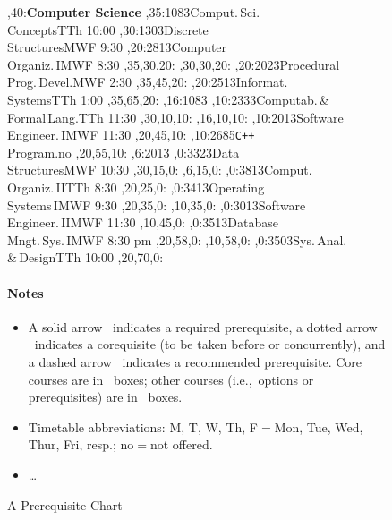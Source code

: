 \documentclass[11pt]{article}
\begin{document}
\begin{figure}\small
\setcounter{diagheight}{40}
\begin{chart}\sf
{},40:{\textsf{\textbf{\Large Computer Science}}}
,35:{1083}{Comput.\,Sci.\\Concepts}{TTh 10:00}
,30:{1303}{Discrete\\Structures}{MWF 9:30}
,20:{2813}{Computer\\Organiz.\,I}{MWF 8:30}
  ,35,30,20:
  ,30,30,20:
,20:{2023}{Procedural\\Prog.\,Devel.}{MWF 2:30}
  ,35,45,20:
,20:{2513}{Informat.\\Systems}{TTh 1:00}
  ,35,65,20:
,16:{1083}
,10:{2333}{Computab.\,\&\\Formal\,Lang.}{TTh 11:30}
  ,30,10,10:
  ,16,10,10:
,10:{2013}{Software\\Engineer.\,I}{MWF 11:30}
  ,20,45,10:
,10:{2685}{\texttt{C++}\\Program.}{no}
  ,20,55,10:
,6:{2013}
,0:{3323}{Data\\Structures}{MWF 10:30}
  ,30,15,0:
  ,6,15,0:
,0:{3813}{Comput.\\Organiz.\,II}{TTh 8:30}
  ,20,25,0:
,0:{3413}{Operating\\Systems\,I}{MWF 9:30}
  ,20,35,0:
  ,10,35,0:
,0:{3013}{Software\\Engineer.\,II}{MWF 11:30}
  ,10,45,0:
,0:{3513}{Database\\Mngt.\,Sys.\,I}{MWF 8:30 pm}
  ,20,58,0:
  ,10,58,0:
,0:{3503}{Sys.\,Anal.\\\&\,Design}{TTh 10:00}
  ,20,70,0:
\end{chart}

\paragraph{Notes}
\begin{itemize}
\item
A solid arrow \solidarrow\  indicates a required prerequisite, 
a dotted arrow \dottedarrow\ 
indicates a corequisite (to be taken before or concurrently), and a
dashed arrow \dashedarrow\ indicates a recommended prerequisite.
Core courses are in \boldbox\ boxes; 
other courses (i.e.,~options or prerequisites)
are in \lightbox\ boxes.
\item Timetable abbreviations: M, T, W, Th, F$=$Mon, Tue, Wed, Thur, Fri, resp.; no$=$not offered.
\item \dots
\end{itemize}
\caption{A Prerequisite Chart}
\label{chart}
\end{figure}
\end{document}
